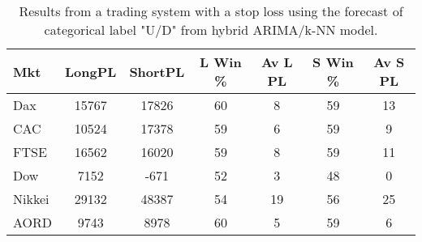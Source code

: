 \begin{table}[ht]
\centering
\caption[Results from a trading system with a stop loss using the forecast of categorical label "U/D" from hybrid ARIMA/k-NN model]{Results from a trading system with a stop loss using the forecast of categorical label "U/D" from hybrid ARIMA/k-NN model.} 
\label{tab:chp_ts:pUD_CAT_arima_knn_sys_SL}
\begin{tabular}{lcccccc}
  \toprule Mkt & LongPL & ShortPL & L Win \% & Av L PL & S Win \% & Av S PL \\ 
  \midrule Dax & 15767 & 17826 & 60 & 8 & 59 & 13 \\ 
  CAC & 10524 & 17378 & 59 & 6 & 59 & 9 \\ 
  FTSE & 16562 & 16020 & 59 & 8 & 59 & 11 \\ 
  Dow & 7152 & -671 & 52 & 3 & 48 & 0 \\ 
  Nikkei & 29132 & 48387 & 54 & 19 & 56 & 25 \\ 
  AORD & 9743 & 8978 & 60 & 5 & 59 & 6 \\ 
   \bottomrule \end{tabular}
\end{table}
